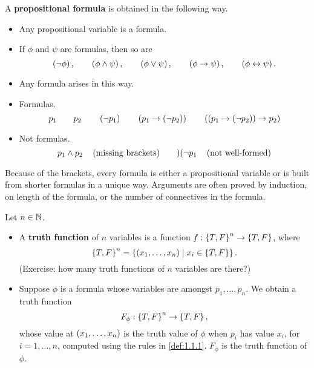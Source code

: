 \begin{definition}
\label{def:1.1.2}
A \textbf{propositional formula} is obtained in the following way.
\begin{itemize}
\item Any propositional variable is a formula.
\item If $ \phi $ and $ \psi $ are formulas, then so are
$$ \left( \neg \phi \right), \qquad \left( \phi \land \psi \right), \qquad \left( \phi \lor \psi \right), \qquad \left( \phi \rightarrow \psi \right), \qquad \left( \phi \leftrightarrow \psi \right). $$
\item Any formula arises in this way.
\end{itemize}
\end{definition}

\pagebreak

\begin{example2}
\hfill
\begin{itemize}
\item Formulas.
$$ p_1 \qquad p_2 \qquad \left( \neg p_1 \right) \qquad \left( p_1 \rightarrow \left( \neg p_2 \right) \right) \qquad \left( \left( p_1 \rightarrow \left( \neg p_2 \right) \right) \rightarrow p_2 \right) $$
\item Not formulas.
$$ p_1 \land p_2 \quad \left( \text{missing brackets} \right) \qquad )( \neg p_1 \quad \left( \text{not well-formed} \right) $$
\end{itemize}
\end{example2}

Because of the brackets, every formula is either a propositional variable or is built from shorter formulas in a unique way. Arguments are often proved by induction, on length of the formula, or the number of connectives in the formula.

\begin{definition}
Let $ n \in \mathbb{N} $.
\begin{itemize}
\item A \textbf{truth function} of $ n $ variables is a function $ f : \left\{ T, F \right\}^n \to \left\{ T, F \right\} $, where
$$ \left\{ T, F \right\}^n = \left\{ \left( x_1, \dots, x_n \right) \mid x_i \in \left\{ T, F \right\} \right\}. $$
(Exercise: how many truth functions of $ n $ variables are there?)
\item Suppose $ \phi $ is a formula whose variables are amongst $ p_1, \dots, p_n $. We obtain a truth function
$$ F_\phi : \left\{ T, F \right\}^n \to \left\{ T, F \right\}, $$
whose value at $ \left( x_1, \dots, x_n \right) $ is the truth value of $ \phi $ when $ p_i $ has value $ x_i $, for $ i = 1, \dots, n $, computed using the rules in \ref{def:1.1.1}. $ F_\phi $ is the truth function of $ \phi $.
\end{itemize}
\end{definition}

